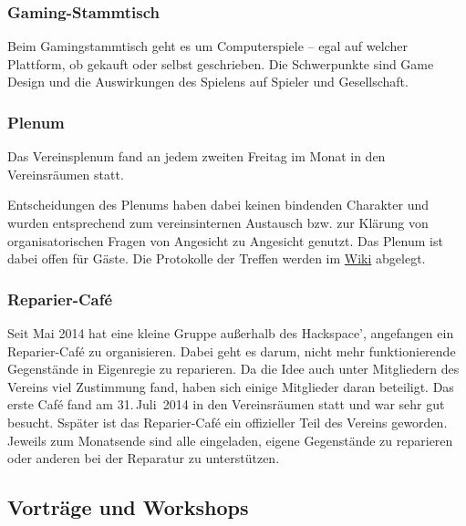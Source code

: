 \documentclass[ngerman]{scrartcl}
\begin{document}
\subsubsection{Gaming-Stammtisch}

Beim Gamingstammtisch geht es um Computerspiele -- egal auf welcher Plattform, ob gekauft oder selbst geschrieben.
Die Schwerpunkte sind Game Design und die Auswirkungen des Spielens auf Spieler und Gesellschaft. 

\subsubsection{Plenum}

Das Vereinsplenum fand an jedem zweiten Freitag im Monat in den
Vereinsräumen statt.

Entscheidungen des Plenums haben dabei keinen bindenden Charakter und
wurden entsprechend zum vereinsinternen Austausch bzw. zur Klärung von
organisatorischen Fragen von Angesicht zu Angesicht genutzt. Das Plenum ist dabei offen für Gäste.
Die Protokolle der Treffen werden im \href{https://www.krautspace.de/hswiki:verein:plenum:start}{Wiki} abgelegt.

\subsubsection{Reparier-Café}

Seit Mai 2014 hat eine kleine Gruppe außerhalb des Hackspace', angefangen ein Reparier-Café zu organisieren. Dabei geht es darum, nicht mehr funktionierende Gegenstände in Eigenregie zu reparieren.
Da die Idee auch unter Mitgliedern des Vereins viel Zustimmung fand, haben sich einige Mitglieder daran beteiligt. 
Das erste Café fand am 31.\,Juli~2014 in den Vereinsräumen statt und war sehr gut besucht. 
Sspäter ist das Reparier-Café ein offizieller Teil des Vereins geworden. Jeweils zum Monatsende sind alle eingeladen, eigene Gegenstände zu reparieren oder anderen bei der Reparatur zu unterstützen.


\subsection{Vorträge und Workshops}
\end{document}
